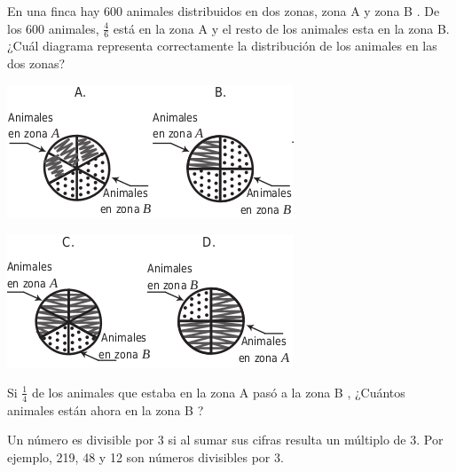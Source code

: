 \documentclass[10pt,addpoints]{exam}
\begin{document}
\begin{multicols}{2}
\begin{questions}
En una finca hay 600 animales distribuidos en dos zonas, zona A y zona B . De los 600 animales, $\frac{4}{6}$ está en la zona A y el resto de los animales esta en la zona B.
\question ¿Cuál diagrama representa correctamente la distribución de los animales en las dos zonas?
\begin{center}
\includegraphics[scale=.5]{Images/Pantallazo-21.png}
\end{center}
\begin{center}
\includegraphics[scale=.5]{Images/Pantallazo-22.png} 
\end{center}
\question Si $\frac{1}{4}$ de los animales que estaba en la zona A pasó a la zona B , ¿Cuántos animales están ahora en la zona B ?

\begin{oneparchoices}
\end{oneparchoices}
\question Un número es divisible por 3 si al sumar sus cifras resulta un múltiplo de 3. Por ejemplo, 219, 48 y 12 son números divisibles por 3.


\end{questions}
\end{multicols}
\end{document}
